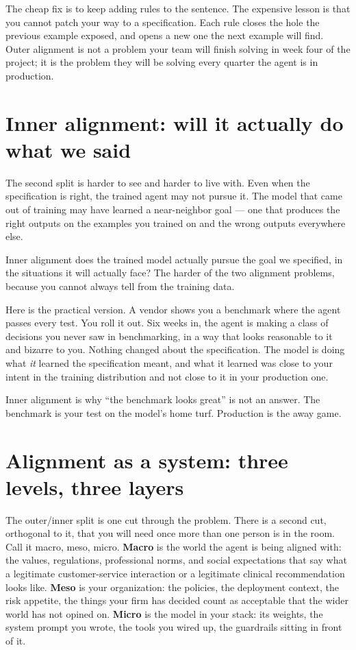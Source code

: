 The cheap fix is to keep adding rules to the sentence. The expensive lesson is that you cannot patch your way to a specification. Each rule closes the hole the previous example exposed, and opens a new one the next example will find. Outer alignment is not a problem your team will finish solving in week four of the project; it is the problem they will be solving every quarter the agent is in production.

\section{Inner alignment: will it actually do what we said}

The second split is harder to see and harder to live with. Even when the specification is right, the trained agent may not pursue it. The model that came out of training may have learned a near-neighbor goal --- one that produces the right outputs on the examples you trained on and the wrong outputs everywhere else.

\begin{TNdefinition}{Inner alignment} does the trained model actually pursue the goal we specified, in the situations it will actually face? The harder of the two alignment problems, because you cannot always tell from the training data. \end{TNdefinition}

Here is the practical version. A vendor shows you a benchmark where the agent passes every test. You roll it out. Six weeks in, the agent is making a class of decisions you never saw in benchmarking, in a way that looks reasonable to it and bizarre to you. Nothing changed about the specification. The model is doing what \textit{it} learned the specification meant, and what it learned was close to your intent in the training distribution and not close to it in your production one.

Inner alignment is why ``the benchmark looks great'' is not an answer. The benchmark is your test on the model's home turf. Production is the away game.

\section{Alignment as a system: three levels, three layers}

The outer/inner split is one cut through the problem. There is a second cut, orthogonal to it, that you will need once more than one person is in the room. Call it macro, meso, micro. \textbf{Macro} is the world the agent is being aligned with: the values, regulations, professional norms, and social expectations that say what a legitimate customer-service interaction or a legitimate clinical recommendation looks like. \textbf{Meso} is your organization: the policies, the deployment context, the risk appetite, the things your firm has decided count as acceptable that the wider world has not opined on. \textbf{Micro} is the model in your stack: its weights, the system prompt you wrote, the tools you wired up, the guardrails sitting in front of it.

